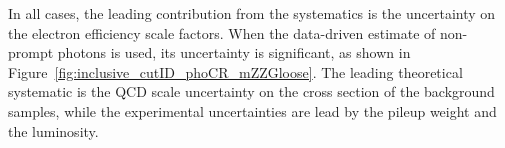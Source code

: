 In all cases, the leading contribution from the systematics is the uncertainty on the electron efficiency scale factors.
When the data-driven estimate of non-prompt photons is used, its uncertainty is significant, as shown in Figure~\ref{fig:inclusive_cutID_phoCR_mZZGloose}.
The leading theoretical systematic is the QCD scale uncertainty on the cross section of the background samples,
while the experimental uncertainties are lead by the pileup weight and the luminosity.
